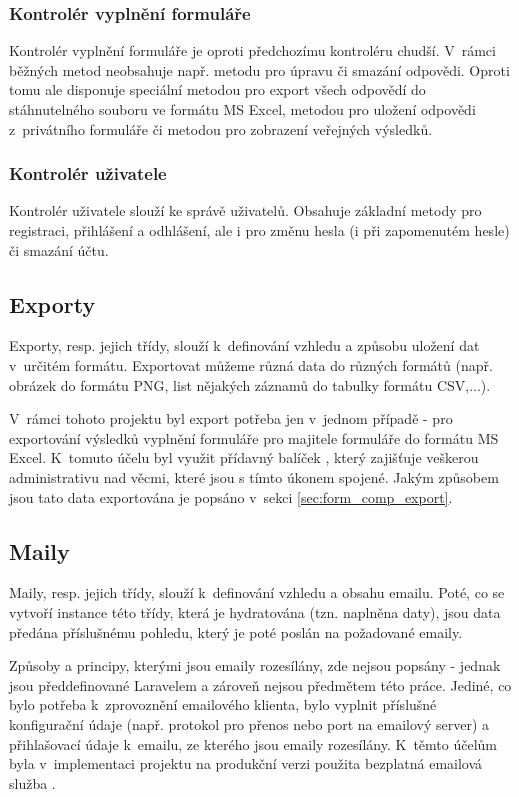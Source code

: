 		\subsubsection{Kontrolér vyplnění formuláře}
		Kontrolér vyplnění formuláře je oproti předchozímu kontroléru chudší. V~rámci běžných metod neobsahuje např. metodu pro úpravu či smazání odpovědi. Oproti tomu ale disponuje speciální metodou pro export všech odpovědí do stáhnutelného souboru ve formátu MS Excel, metodou pro uložení odpovědi z~privátního formuláře či metodou pro zobrazení veřejných výsledků.
		
		\subsubsection{Kontrolér uživatele}
		Kontrolér uživatele slouží ke správě uživatelů. Obsahuje základní metody pro registraci, přihlášení a odhlášení, ale i pro změnu hesla (i při zapomenutém hesle) či smazání účtu.
	
	\subsection{Exporty}\label{sec:exports}
	Exporty, resp. jejich třídy, slouží k~definování vzhledu a způsobu uložení dat v~určitém formátu. Exportovat můžeme různá data do různých formátů (např. obrázek do formátu PNG, list nějakých záznamů do tabulky formátu CSV,...).
	
	V~rámci tohoto projektu byl export potřeba jen v~jednom případě - pro exportování výsledků vyplnění formuláře pro majitele formuláře do formátu MS Excel. K~tomuto účelu byl využit přídavný balíček , který zajišťuje veškerou administrativu nad věcmi, které jsou s tímto úkonem spojené. Jakým způsobem jsou tato data exportována je popsáno v~sekci \ref{sec:form_comp_export}.
	
	\subsection{Maily}
	Maily, resp. jejich třídy, slouží k~definování vzhledu a obsahu emailu. Poté, co se vytvoří instance této třídy, která je hydratována (tzn. naplněna daty), jsou data předána příslušnému pohledu, který je poté poslán na požadované emaily.
	
	Způsoby a principy, kterými jsou emaily rozesílány, zde nejsou popsány - jednak jsou předdefinované Laravelem a zároveň nejsou předmětem této práce. Jediné, co bylo potřeba k~zprovoznění emailového klienta, bylo vyplnit příslušné konfigurační údaje (např. protokol pro přenos nebo port na emailový server) a přihlašovací údaje k~emailu, ze kterého jsou emaily rozesílány. K~těmto účelům byla v~implementaci projektu na produkční verzi použita bezplatná emailová služba .
	
